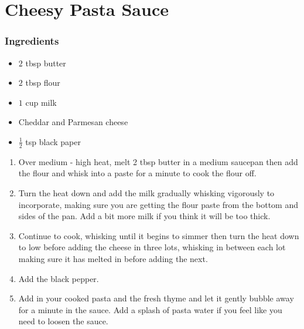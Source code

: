 \section{Cheesy Pasta Sauce}
\subsubsection{Ingredients}
\begin{itemize}
    \item $2$ tbsp butter
    \item $2$ tbsp flour
    \item $1$ cup milk
    \item Cheddar and Parmesan cheese
    \item $\frac{1}{2}$ tsp black paper
\end{itemize}

\begin{enumerate}
    \item Over medium - high heat, melt 2 tbsp butter in a medium saucepan then add the flour and whisk into a paste for a minute to cook the flour off.
    \item Turn the heat down and add the milk gradually whisking vigorously to incorporate, making sure you are getting the flour paste from the bottom and sides of the pan. Add a bit more milk if you think it will be too thick.
    \item Continue to cook, whisking until it begins to simmer then turn the heat down to low before adding the cheese in three lots, whisking in between each lot making sure it has melted in before adding the next.
    \item Add the black pepper.
    \item Add in your cooked pasta and the fresh thyme and let it gently bubble away for a minute in the sauce. Add a splash of pasta water if you feel like you need to loosen the sauce.
\end{enumerate}
